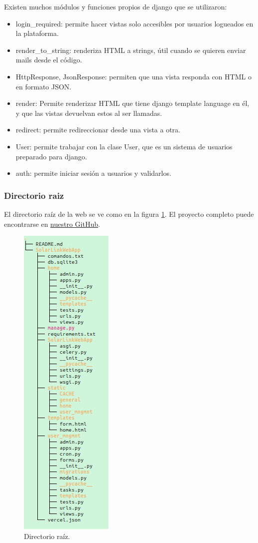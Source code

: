 Existen muchos módulos y funciones propios de django que se utilizaron:
\begin{itemize}
    \item login\_required: permite hacer vistas solo accesibles por usuarios logueados en la plataforma.
    \item render\_to\_string: renderiza HTML a strings, útil cuando se quieren enviar mails desde el código.
    \item HttpResponse, JsonResponse: permiten que una vista responda con HTML o en formato JSON.
    \item render: Permite renderizar HTML que tiene django template language en él, y que las vistas devuelvan estos al ser llamadas.
    \item redirect: permite redireccionar desde una vista a otra.
    \item User: permite trabajar con la clase User, que es un sistema de usuarios preparado para django.
    \item auth: permite iniciar sesión a usuarios y validarlos.
\end{itemize}

\subsubsection{Directorio raiz}

El directorio raíz de la web se ve como en la figura \ref{fig:root-dir}. El proyecto completo puede encontrarse en \href{https://github.com/solarlink-ar/solarlink}{nuestro GitHub}.

\begin{figure}[H]
    \centering
    \includegraphics[width=0.18\linewidth]{web/imageedit_2_7842957095.png}
    \caption{Directorio raíz.}
    \label{fig:root-dir}
\end{figure}


